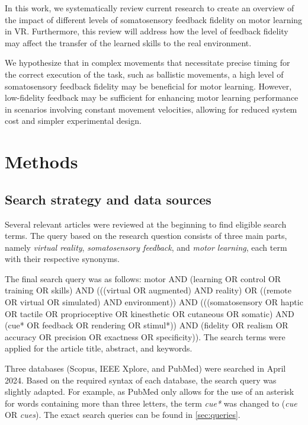 \documentclass[conference]{IEEEtran}
\begin{document}
In this work, we systematically review current research to create an overview of the impact of different levels of somatosensory feedback fidelity on motor learning in VR. Furthermore, this review will address how the level of feedback fidelity may affect the transfer of the learned skills to the real environment.

We hypothesize that in complex movements that necessitate precise timing for the correct execution of the task, such as ballistic movements, a high level of somatosensory feedback fidelity may be beneficial for motor learning. However, low-fidelity feedback may be sufficient for enhancing motor learning performance in scenarios involving constant movement velocities, allowing for reduced system cost and simpler experimental design. \newpage


\section{Methods}

\subsection{Search strategy and data sources}
Several relevant articles were reviewed at the beginning to find eligible search terms. The query based on the research question consists of three main parts, namely \textit{virtual reality}, \textit{somatosensory feedback}, and \textit{motor learning}, each term with their respective synonyms. 

The final search query was as follows: motor AND (learning OR control OR training OR skills) AND (((virtual OR augmented) AND reality) OR ((remote OR virtual OR simulated) AND environment)) AND (((somatosensory OR haptic OR tactile OR proprioceptive OR kinesthetic OR cutaneous OR somatic) AND 
(cue* OR feedback OR rendering OR stimul*)) AND (fidelity OR realism OR accuracy OR precision OR exactness OR specificity)). The search terms were applied for the article title, abstract, and keywords.

Three databases (Scopus, IEEE Xplore, and PubMed) were searched in April 2024. Based on the required syntax of each database, the search query was slightly adapted. For example, as PubMed only allows for the use of an asterisk for words containing more than three letters, the term \textit{cue*} was changed to (\textit{cue} OR \textit{cues}). The exact search queries can be found in \ref{sec:queries}. 
\end{document}
